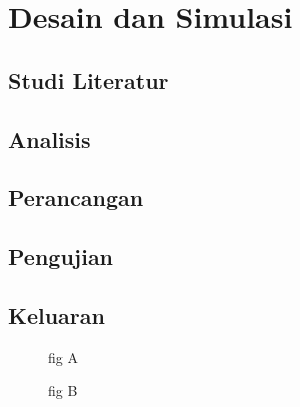 \chapter{Desain dan Simulasi}
\blindtext[2]

\section{Studi Literatur}
\blindtext[2]
\section{Analisis}
\blindtext[3]
\section{Perancangan}
\blindtext[6]
\section{Pengujian}
\blindtext[3]
\section{Keluaran}
\blindtext[2]
\begin{figure}
	\caption{fig A}
\end{figure}
\begin{figure}
	\caption{fig B}
\end{figure}
